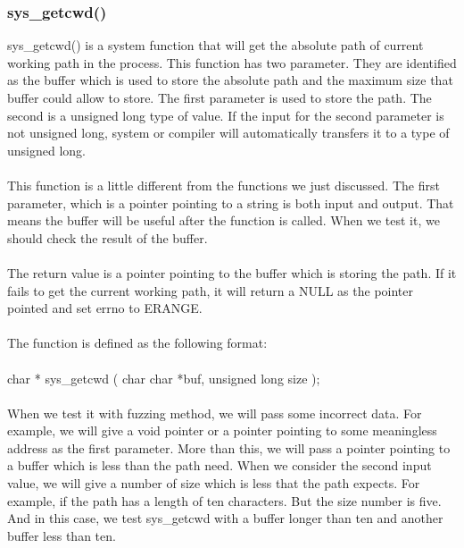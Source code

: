 \documentclass[twoside]{article}
\begin{document}
\begin{multicols}{2}
\subsubsection{sys\_getcwd()}
sys\_getcwd() is a system function that will get the absolute path of current working path in the process. This function has two parameter. They are identified as the buffer which is used to store the absolute path and the maximum size that buffer could allow to store. The first parameter is used to store the path. The second is a unsigned long type of value. If the input for the second parameter is not unsigned long, system or compiler will automatically transfers it to a type of unsigned long.\\\\
This function is a little different from the functions we just discussed. The first parameter, which is a pointer pointing to a string is both input and output. That means the buffer will be useful after the function is called. When we test it, we should check the result of the buffer.\\\\
The return value is a pointer pointing to the buffer which is storing the path. If it fails to get the current working path, it will return a NULL as the pointer pointed and set errno to ERANGE.\\\\
The function is defined as the following format:\\\\
char * sys\_getcwd ( char char *buf, unsigned long size );\\\\
When we test it with fuzzing method, we will pass some incorrect data. For example, we will give a void pointer or a pointer pointing to some meaningless address as the first parameter. More than this, we will pass a pointer pointing to a buffer which is less than the path need. When we consider the second input value, we will give a number of size which is less that the path expects. For example, if the path has a length of ten characters. But the size number is five. And in this case, we test sys\_getcwd with a buffer longer than ten and another buffer less than ten.

\end{multicols}
\end{document}
